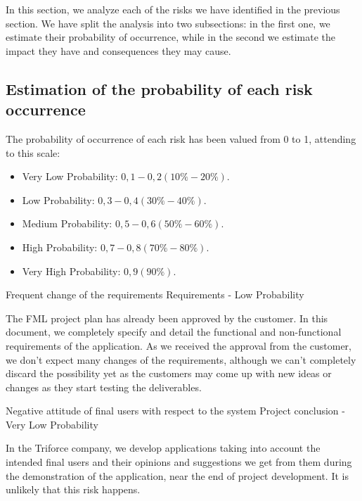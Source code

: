 
In this section, we analyze each of the risks we have identified in the previous section. We have split the analysis into two subsections: in the first one, we estimate their probability of occurrence, while in the second we estimate the impact they have and consequences they may cause.

\subsection{Estimation of the probability of each risk occurrence}
The probability of occurrence of each risk has been valued from 0 to 1, attending to this scale:
\begin{itemize}
\item Very Low Probability: $0,1-0,2 (10\%-20\%)$.
\item Low Probability: $0,3-0,4 (30\%-40\%)$.
\item Medium Probability: $0,5-0,6 (50\%-60\%)$.
\item High Probability: $0,7-0,8 (70\%-80\%)$.
\item Very High Probability: $0,9 (90\%)$.
\end{itemize}


\begin{risk}[riskReqChange]{Frequent change of the requirements}
\riskcat Requirements
 - Low Probability

The FML project plan has already been approved by the customer. In this document, we completely specify and detail the functional and non-functional requirements of the application. As we received the approval from the customer, we don't expect many changes of the requirements, although we can't completely discard the possibility yet as the customers may come up with new ideas or changes as they start testing the deliverables.
\end{risk}

\begin{risk}[riskAttitude]{Negative attitude of final users with respect to the system}
\riskcat Project conclusion
 - Very Low Probability

In the Triforce company, we develop applications taking into account the intended final users and their opinions and suggestions we get from them during the demonstration of the application, near the end of project development. It is unlikely that this risk happens.
\end{risk}

